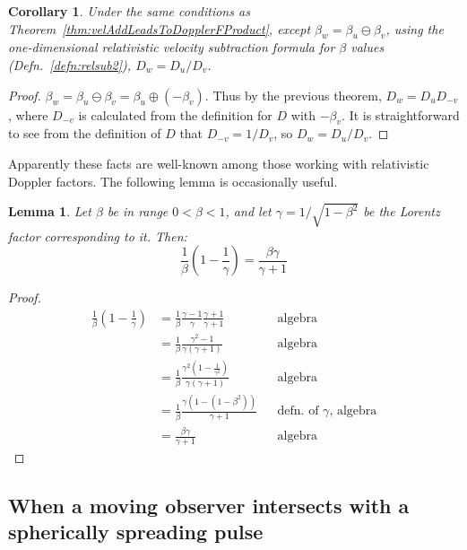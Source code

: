 \documentclass[a4paper]{article}
\theoremstyle{plain}
\newtheorem{corollary}[theorem]{Corollary}
\newtheorem{lemma}[theorem]{Lemma}
\theoremstyle{definition}
\begin{document}
\begin{corollary}
\label{thm:velSubLeadsToDopplerFQuotient}
Under the same conditions as Theorem~\ref{thm:velAddLeadsToDopplerFProduct},
except $\beta_w = \beta_u \ominus \beta_v$, using the one-dimensional
relativistic velocity subtraction formula for $\beta$ values
(Defn.~\eqref{defn:relsub2}),
$D_w = D_u / D_v$.
\end{corollary}

\begin{proof}
$\beta_w = \beta_u \ominus \beta_v = \beta_u \oplus (-\beta_v)$.
Thus by the previous theorem, $D_w = D_u D_{-v}$,
where $D_{-v}$ is calculated from the definition for $D$ with $-\beta_v$.
It is straightforward to see from the definition of $D$ that
$D_{-v} = 1/D_v$, so $D_w = D_u / D_v$.
\end{proof}

Apparently these facts are well-known among those working with
relativistic Doppler factors.
The following lemma is occasionally useful.
\begin{lemma}
\label{lem:betaGammaIdentity1}
Let $\beta$ be in range $0 < \beta < 1$,
and let $\gamma = 1/\sqrt{1-\beta^2}$ be the Lorentz factor
corresponding to it.
Then:
\begin{equation}
\frac{1}{\beta} (1-\frac{1}{\gamma}) = \frac{\beta\gamma}{\gamma+1}
\end{equation}
\end{lemma}

\begin{proof}
\begin{align*}
\frac{1}{\beta} (1-\frac{1}{\gamma})
  & = \frac{1}{\beta} \frac{\gamma-1}{\gamma} \frac{\gamma+1}{\gamma+1} & & \text{algebra} \\
  & = \frac{1}{\beta} \frac{\gamma^2-1}{\gamma(\gamma+1)} & & \text{algebra} \\
  & = \frac{1}{\beta} \frac{\gamma^2(1-\frac{1}{\gamma^2})}{\gamma(\gamma+1)} & & \text{algebra} \\
  & = \frac{1}{\beta} \frac{\gamma(1-(1-\beta^2))}{\gamma+1} & & \text{defn. of $\gamma$, algebra} \\
  & = \frac{\beta\gamma}{\gamma+1} & & \text{algebra}
\end{align*}
\end{proof}


\subsection{When a moving observer intersects with a spherically spreading pulse}
\label{app:IntersectingSpreadingPulse}
\end{document}
